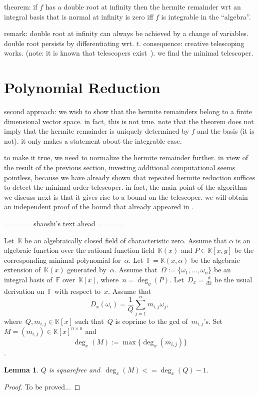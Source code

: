 \documentclass{sig-alternate}
\newtheorem{lemma}[theorem]{Lemma}
\newcommand{\red}{\color{red}}
\newcommand{\bF}{ {\mathbb F}}
\newcommand{\bK}{ {\mathbb K}}
\begin{document}
theorem: if $f$ has a double root at infinity then the hermite remainder wrt an integral
basis that is normal at infinity is zero iff $f$ is integrable in the ``algebra''.

remark: double root at infinity can always be achieved by a change of variables.
double root persists by differentiating wrt. $t$. consequence: creative telescoping works.
(note: it is known that telescopers exist~\cite{..,..,..}). 
we find the minimal telescoper.

\section{Polynomial Reduction}

second approach: we wish to show that the hermite remainders belong to a finite dimensional
vector space. in fact, this is not true. 
note that the theorem does not imply that the hermite remainder is uniquely determined by
$f$ and the basis (it is not). it only makes a statement about the integrable case. 

to make it true, we need to normalize the hermite remainder further. in view of the result
of the previous section, investing additional computational seems pointless, because we have
already shown that repeated hermite reduction suffices to detect the minimal order telescoper.
in fact, the main point of the algorithm we discuss next is that it gives rise to a bound on
the telescoper. we will obtain an independent proof of the bound that already appeared in \cite{GAZ}. 

===== shaoshi's text ahead =====

Let~$\bK$ be an algebraically closed field of characteristic zero.
Assume that $\alpha$ is an algebraic function over the rational function
field~$\bK(x)$ and $P\in \bK[x, y]$ be the corresponding minimal polynomial for~$\alpha$.
Let~$\bF = \bK(x, \alpha)$ be the algebraic extension of~$\bK(x)$ generated by~$\alpha$.
Assume that~$\Omega:=\{\omega_1, \ldots, \omega_n\}$ be an integral basis of~$\bF$
over~$\bK[x]$, where~$n=\deg_y(P)$. Let~$D_x=\frac{d}{dx}$ be the usual derivation on~$\bF$
with respect to~$x$. Assume that
\[D_x(\omega_i) = \frac{1}{Q}\sum_{j=1}^n m_{i, j}\omega_j,\]
where~$Q, m_{i, j}\in \bK[x]$ such that~$Q$ is coprime to the gcd of~$m_{i,j}$'s. Set~$M=(m_{i, j})\in \bK[x]^{n\times n}$
and
\[\deg_x(M):= \max\{\deg_x(m_{i, j})\}\].
\begin{lemma}\label{LEM:M}
$Q$ is squarefree and~$\deg_x(M) <= \deg_x(Q)-1$.
\end{lemma}
\begin{proof}{\red To be proved...}
\end{proof}
\end{document}

